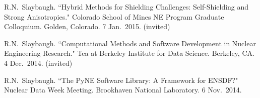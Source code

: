 \begin{bibsection}

\item R.N.\ Slaybaugh. ``Hybrid Methods for Shielding Challenges: Self-Shielding and Strong Anisotropies." Colorado School of Mines NE Program Graduate Colloquium. Golden, Colorado. 7 Jan.\ 2015. (invited)




\item R.N.\ Slaybaugh. ``Computational Methods and Software Development in Nuclear Engineering Research." Tea at Berkeley Institute for Data Science. Berkeley, CA. 4 Dec.\ 2014. (invited)


\item R.N.\ Slaybaugh. ``The PyNE Software Library: A Framework for ENSDF?" Nuclear Data Week Meeting. Brookhaven National Laboratory. 6 Nov.\ 2014. 





\end{bibsection}
